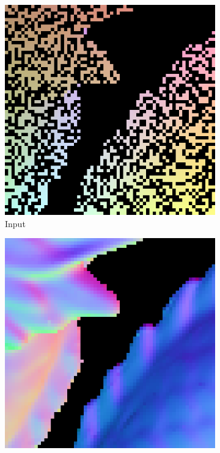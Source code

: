 \documentclass[border=15pt, multi, tikz]{article}
\begin{document}
\begin{figure}[th]
	\centering
	\begin{subfigure}[b]{0.15\linewidth}
		\includegraphics[width=\linewidth]{./Figures/comparison/eval_2_input.png}
		\caption{Input}
	\end{subfigure}
	\begin{subfigure}[b]{0.15\linewidth}
		\includegraphics[width=\linewidth]{./Figures/comparison/eval_2_normal_GT.png}

\end{subfigure}
\end{figure}
\end{document}
